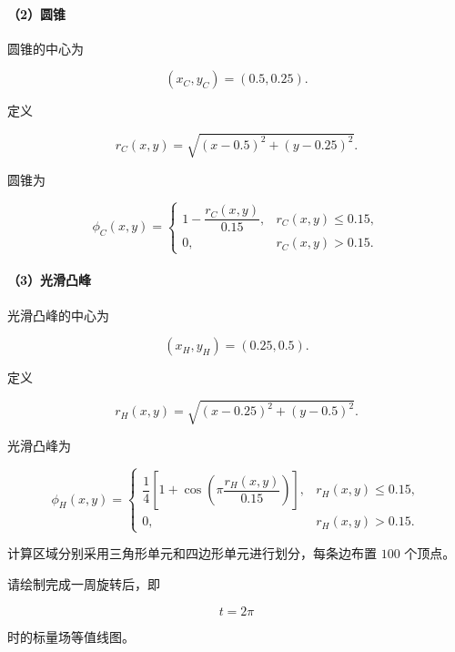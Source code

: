 \documentclass[UTF8,12pt,a4paper,fontset=fandol]{ctexart}
\begin{document}
\newpage
\paragraph{（2）圆锥}

圆锥的中心为

\begin{equation}
(x_C,y_C)=(0.5,0.25).
\end{equation}

定义

\begin{equation}
r_C(x,y)
=\sqrt{(x-0.5)^2+(y-0.25)^2}.
\end{equation}

圆锥为

\begin{equation}
\phi_C(x,y)
=
\begin{cases}
1-\dfrac{r_C(x,y)}{0.15},
&r_C(x,y)\leq0.15,\\[3mm]
0,
&r_C(x,y)>0.15.
\end{cases}
\end{equation}

\paragraph{（3）光滑凸峰}

光滑凸峰的中心为

\begin{equation}
(x_H,y_H)=(0.25,0.5).
\end{equation}

定义

\begin{equation}
r_H(x,y)
=\sqrt{(x-0.25)^2+(y-0.5)^2}.
\end{equation}

光滑凸峰为

\begin{equation}
\phi_H(x,y)
=
\begin{cases}
\dfrac14
\left[
1+
\cos\left(
\pi\dfrac{r_H(x,y)}{0.15}
\right)
\right],
&r_H(x,y)\leq0.15,\\[4mm]
0,
&r_H(x,y)>0.15.
\end{cases}
\end{equation}

计算区域分别采用三角形单元和四边形单元进行划分，每条边布置 $100$ 个顶点。

请绘制完成一周旋转后，即

\begin{equation}
t=2\pi
\end{equation}

时的标量场等值线图。
\end{document}
